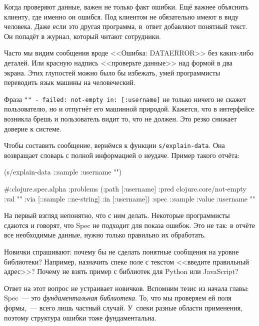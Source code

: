 
\label{spec-messages}

Когда проверяют данные, важен не только факт ошибки. Ещё важнее объяснить
клиенту, где именно он ошибся. Под клиентом не обязательно имеют в виду
человека. Даже если это другая программа, в~ответ добавляют понятный текст. Он
попадёт в журнал, который читают сотрудники.

Часто мы видим сообщения вроде <<Ошибка: DATAERROR>> без каких-либо деталей. Или
красную надпись <<проверьте данные>> над формой в два экрана. Этих глупостей
можно было бы избежать, умей программисты переводить язык машины на человеческий.


Фраза \texttt{"" - failed: not-empty in: [:user\-name]} не только ничего не скажет
пользователю, но и отпугнёт его машинной природой. Кажется, что в интерфейсе
возникла брешь и пользователь видит то, что не должен. Это резко снижает
доверие к системе.

Чтобы составить сообщение, вернёмся к функции \verb|s/explain-data|. Она
возвращает словарь с полной информацией о неудаче. Пример такого отчёта:

\begin{english}
  \begin{clojure}
(s/explain-data ::sample {:username ""})

#:clojure.spec.alpha
{:problems
 ({:path [:username]
   :pred clojure.core/not-empty
   :val ""
   :via [::sample ::ne-string]
   :in [:username]})
 :spec ::sample
 :value {:username ""}}
  \end{clojure}
\end{english}


На первый взгляд непонятно, что с ним делать. Некоторые программисты сдаются и
говорят, что Spec не подходит для показа ошибок. Это не так: в отчёте все
необходимые данные, нужно только правильно их обработать.

Новички спрашивают: почему бы не сделать понятные сообщения на уровне
библиотеки? Например, назначить спеке поле с текстом <<введите правильный
адрес>>? Почему не взять пример с библиотек для Python или JavaScript?


Ответ на этот вопрос не устраивает новичков. Вспомним тезис из начала главы:
Spec~--- это \emph{фундаментальная библиотека}. То, что мы проверяем ей поля
формы,~--- всего лишь частный случай. У~спеки разные области применения, поэтому
структура ошибки тоже фундаментальна.

